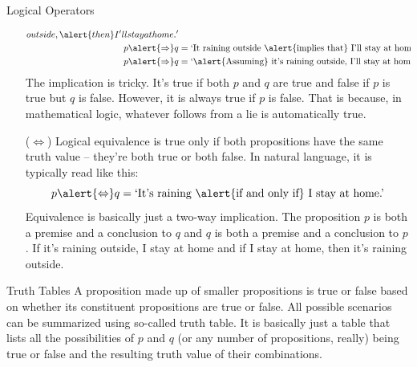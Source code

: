 \documentclass[final]{beamer}
\newlength{\colwidth}
\begin{document}
\begin{frame}[t]
\begin{columns}[t]
\begin{column}{\colwidth}
\begin{exampleblock}{Logical Operators}
\begin{itemize}[left=40pt]
\begin{align*}
{              outside, \alert{then} I'll stay at home.'}\\
              p \alert{ \Rightarrow } q &= \text{`It raining outside
              \alert{implies that} I'll stay at home.'}\\
              p \alert{ \Rightarrow } q &= \text{`\alert{Assuming} it's raining
              outside, I'll stay at home.'}\\
            \end{align*}
            The implication is tricky. It's true if both $p$ and $q$ are true
            and false if $p$ is true but $q$ is false. However, it is
            \alert{always true} if $p$ is \alert{false}. That is because, in
            mathematical logic, whatever follows from a lie is automatically
            true.
          \item[($ \Leftrightarrow $)] Logical \alert{equivalence} is true only
            if both propositions have the \alert{same truth value} -- they're
            both true or both false. In natural language, it is typically read
            like this:
            \[
              p \alert{ \Leftrightarrow }q = \text{`It's raining
                \alert{if and only if}
              I stay at home.'}
            \]
            Equivalence is basically just a two-way implication. The
            proposition $p$ is
            both a premise and a conclusion to $q$ and $q$ is both a
            premise and a
            conclusion to $p$. If it's raining outside, I stay at
            home and if I stay at
            home, then it's raining outside.
        \end{itemize}
      \end{exampleblock}

      \begin{block}{Truth Tables}
        A proposition made up of smaller propositions is true or false based on
        whether its constituent propositions are true or false. All possible
        scenarios can be summarized using so-called \alert{truth table}. It is
        basically just a table that lists all the possibilities of $p$ and $q$
        (or any number of propositions, really) being true or false and the
        resulting truth value of their combinations.


\end{block}
\end{column}
\end{columns}
\end{frame}
\end{document}
